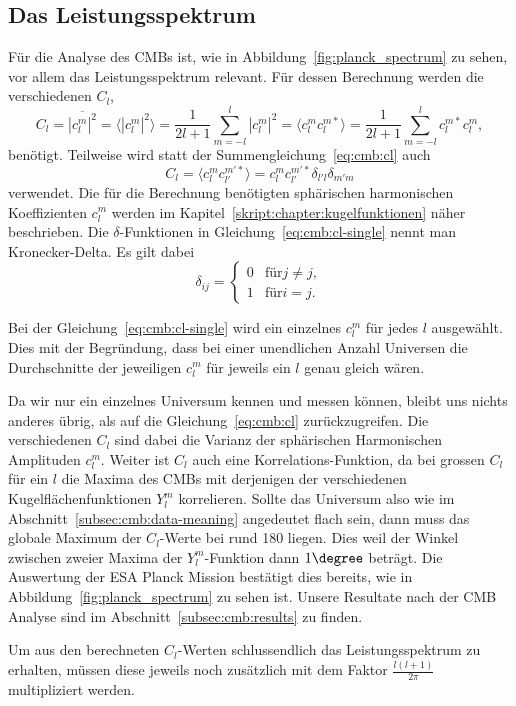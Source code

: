 \subsection{Das Leistungsspektrum\label{subsec:cmb:cl}}

Für die Analyse des CMBs ist, wie in Abbildung~\ref{fig:planck_spectrum} zu 
sehen, vor allem das Leistungsspektrum relevant. Für dessen Berechnung werden 
die verschiedenen $C_l$,
\begin{equation}
	C_l = \overline{|c_l^m|^2} = \langle |c_l^m|^2 \rangle =  \frac{1}{2l + 
	1}\sum_{m=-l}^{l}|c_l^m|^2 = \langle c_l^m 
	c_l^{m*} \rangle = 
	\frac{1}{2l + 
	1}\sum_{m=-l}^{l}c_l^{m*}c_l^m,
	\label{eq:cmb:cl}
\end{equation}
benötigt. Teilweise wird statt der Summengleichung~\ref{eq:cmb:cl} auch
\begin{equation*}
	C_l = \langle c_{l}^{m}c_{l'}^{m'*} \rangle = 
	c_{l}^{m}c_{l'}^{m'*}\delta_{l'l}\delta_{m'm}
	\label{eq:cmb:cl-single}
\end{equation*}
verwendet. Die für die Berechnung benötigten sphärischen harmonischen 
Koeffizienten $c_l^m$ werden im Kapitel~\ref{skript:chapter:kugelfunktionen} 
näher beschrieben. Die $\delta$-Funktionen in Gleichung~\ref{eq:cmb:cl-single} 
nennt man Kronecker-Delta. Es gilt dabei
\begin{equation}
\delta_{ij} =
\begin{cases}
0 & \text{für} j \neq j, \\
1 & \text{für} i = j.
\end{cases}
\end{equation}

Bei der Gleichung~\ref{eq:cmb:cl-single} wird ein einzelnes 
$c_l^m$ für jedes $l$ ausgewählt. Dies mit der Begründung, dass bei einer 
unendlichen Anzahl Universen die Durchschnitte der jeweiligen $c_l^m$ für 
jeweils ein $l$ genau gleich wären. \cite{cmb:klauber}

Da wir nur ein einzelnes Universum kennen und messen können, bleibt uns 
nichts anderes übrig, als auf die Gleichung~\ref{eq:cmb:cl} zurückzugreifen. 
Die verschiedenen $C_l$ sind dabei die Varianz der sphärischen Harmonischen 
Amplituden $c_l^m$. Weiter ist $C_l$ auch eine Korrelations-Funktion, da bei 
grossen $C_l$ für ein $l$ die Maxima des CMBs mit derjenigen der verschiedenen 
Kugelflächenfunktionen $Y_l^m$ korrelieren. Sollte das Universum also wie im 
Abschnitt~\ref{subsec:cmb:data-meaning} angedeutet flach sein, dann muss das 
globale Maximum der $C_l$-Werte bei rund 180 liegen. Dies weil der Winkel 
zwischen zweier Maxima der $Y_l^m$-Funktion dann $1\degree$ beträgt. Die 
Auswertung der ESA Planck Mission bestätigt dies bereits, wie in 
Abbildung~\ref{fig:planck_spectrum} zu sehen ist. Unsere Resultate nach der CMB 
Analyse sind im Abschnitt~\ref{subsec:cmb:results} zu finden.

Um aus den berechneten $C_l$-Werten schlussendlich das Leistungsspektrum zu 
erhalten, müssen diese jeweils noch zusätzlich mit dem Faktor 
$\frac{l(l+1)}{2\pi}$ multipliziert werden.